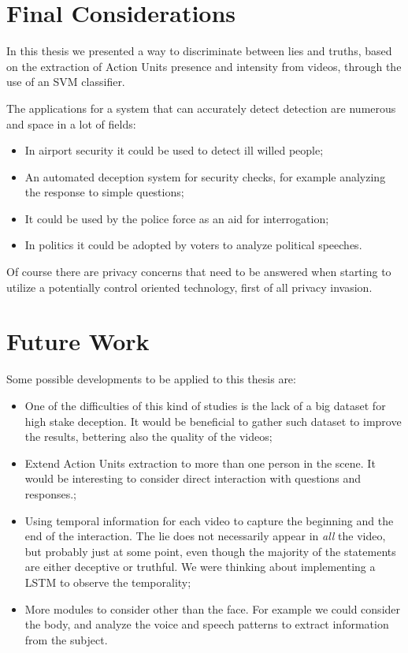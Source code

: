 
\section{Final Considerations}
In this thesis we presented a way to discriminate between lies and truths, based on the extraction of Action Units presence and intensity from videos, through the use of an SVM classifier.

The applications for a system that can accurately detect detection are numerous and space in a lot of fields:
\begin{itemize}
	\item In airport security it could be used to detect ill willed people;
	\item An automated deception system for security checks, for example analyzing the response to simple questions;
	\item It could be used by the police force as an aid for interrogation;
	\item In politics it could be adopted by voters to analyze political speeches.
\end{itemize}
Of course there are privacy concerns that need to be answered when starting to utilize a potentially control oriented technology, first of all privacy invasion.

\section{Future Work} \label{fw}
Some possible developments to be applied to this thesis are:
\begin{itemize}
	\item One of the difficulties of this kind of studies is the lack of a big dataset for high stake deception. It would be beneficial to gather such dataset to improve the results, bettering also the quality of the videos;
	\item Extend Action Units extraction to more than one person in the scene. It would be interesting to consider direct interaction with questions and responses.;
	\item Using temporal information for each video to capture the beginning and the end of the interaction. The lie does not necessarily appear in \textit{all} the video, but probably just at some point, even though the majority of the statements are either deceptive or truthful. We were thinking about implementing a LSTM to observe the temporality;
	\item More modules to consider other than the face. For example we could consider the body, and analyze the voice and speech patterns to extract information from the subject.
\end{itemize}